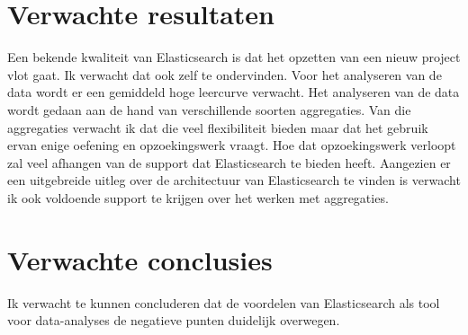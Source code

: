\documentclass[fleqn,10pt]{voorstel}
\begin{document}
	\section{Verwachte resultaten}
	\label{sec:verwachte_resultaten}
	
	Een bekende kwaliteit van Elasticsearch is dat het opzetten van een nieuw project vlot gaat. Ik verwacht dat ook zelf te ondervinden. Voor het analyseren van de data wordt er een gemiddeld hoge leercurve verwacht. Het analyseren van de data wordt gedaan aan de hand van verschillende soorten aggregaties. Van die aggregaties verwacht ik dat die veel flexibiliteit bieden maar dat het gebruik ervan enige oefening en opzoekingswerk vraagt. Hoe dat opzoekingswerk verloopt zal veel afhangen van de support dat Elasticsearch te bieden heeft. Aangezien er een uitgebreide uitleg over de architectuur van Elasticsearch te vinden is verwacht ik ook voldoende support te krijgen over het werken met aggregaties.
	
	
	\section{Verwachte conclusies}
	\label{sec:verwachte_conclusies}
	
	Ik verwacht te kunnen concluderen dat de voordelen van Elasticsearch als tool voor data-analyses de negatieve punten duidelijk overwegen. 
	
	
	\printbibliography[heading=bibintoc]
	
\end{document}
